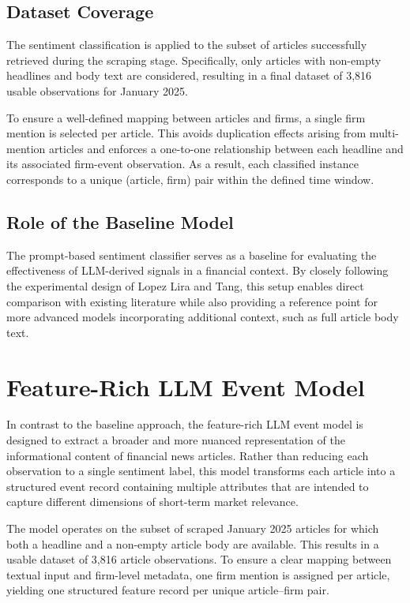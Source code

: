 \subsection{Dataset Coverage}

The sentiment classification is applied to the subset of articles successfully retrieved during the scraping stage. Specifically, only articles with non-empty headlines and body text are considered, resulting in a final dataset of 3,816 usable observations for January 2025.

To ensure a well-defined mapping between articles and firms, a single firm mention is selected per article. This avoids duplication effects arising from multi-mention articles and enforces a one-to-one relationship between each headline and its associated firm-event observation. As a result, each classified instance corresponds to a unique (article, firm) pair within the defined time window.

\subsection{Role of the Baseline Model}

The prompt-based sentiment classifier serves as a baseline for evaluating the effectiveness of LLM-derived signals in a financial context. By closely following the experimental design of Lopez Lira and Tang, this setup enables direct comparison with existing literature while also providing a reference point for more advanced models incorporating additional context, such as full article body text.

\section{Feature-Rich LLM Event Model}

In contrast to the baseline approach, the feature-rich LLM event model is designed to extract a broader and more nuanced representation of the informational content of financial news articles. Rather than reducing each observation to a single sentiment label, this model transforms each article into a structured event record containing multiple attributes that are intended to capture different dimensions of short-term market relevance.

The model operates on the subset of scraped January 2025 articles for which both a headline and a non-empty article body are available. This results in a usable dataset of 3,816 article observations. To ensure a clear mapping between textual input and firm-level metadata, one firm mention is assigned per article, yielding one structured feature record per unique article--firm pair.

